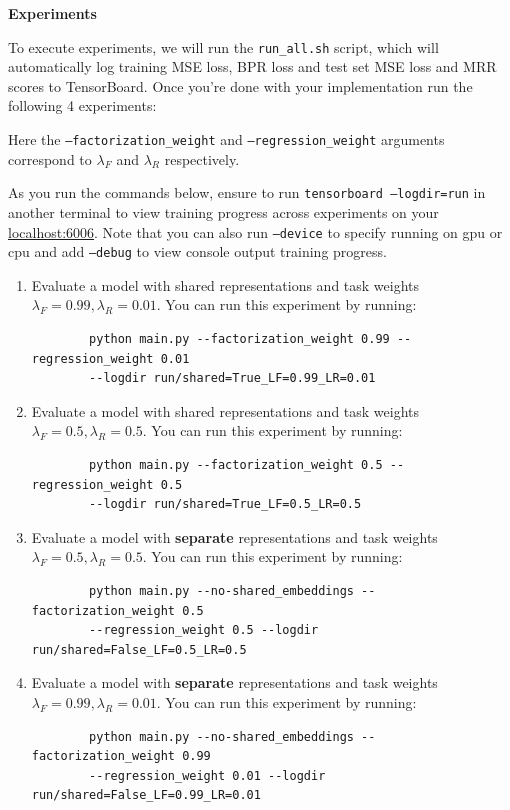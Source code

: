 \item {\bf Experiments}

To execute experiments, we will run the \texttt{run\_all.sh} script, which will automatically log training MSE loss, BPR loss and test set MSE loss and MRR scores to TensorBoard. Once you're done with your implementation run the following 4 experiments:

Here the \texttt{--factorization\_weight} and \texttt{--regression\_weight} arguments correspond to $\lambda_F$ and  $\lambda_R$ respectively.

As you run the commands below, ensure to run \texttt{tensorboard --logdir=run} in another terminal to view training progress across experiments on your \href{http://localhost:6006/}{localhost:6006}. Note that you can also run \texttt{--device} to specify running on gpu or cpu and add \texttt{--debug} to view console output training progress.

\begin{enumerate}[I]
    \item Evaluate a model with shared representations and task weights $\lambda_F=0.99, \lambda_R=0.01$. You can run this experiment by running:
    
    \begin{verbatim}
        python main.py --factorization_weight 0.99 --regression_weight 0.01 
        --logdir run/shared=True_LF=0.99_LR=0.01
    \end{verbatim}    
    
    \item Evaluate a model with shared representations and task weights $\lambda_F=0.5, \lambda_R=0.5$. You can run this experiment by running:    

    \begin{verbatim}
        python main.py --factorization_weight 0.5 --regression_weight 0.5
        --logdir run/shared=True_LF=0.5_LR=0.5
    \end{verbatim}
        
    \item Evaluate a model with \textbf{separate} representations and task weights $\lambda_F=0.5, \lambda_R=0.5$. You can run this experiment by running:    

    \begin{verbatim}
        python main.py --no-shared_embeddings --factorization_weight 0.5
        --regression_weight 0.5 --logdir run/shared=False_LF=0.5_LR=0.5
    \end{verbatim}
        
    \item Evaluate a model with \textbf{separate} representations and task weights $\lambda_F=0.99, \lambda_R=0.01$. You can run this experiment by running:    

    \begin{verbatim}
        python main.py --no-shared_embeddings --factorization_weight 0.99
        --regression_weight 0.01 --logdir run/shared=False_LF=0.99_LR=0.01
    \end{verbatim} 
        
\end{enumerate}

